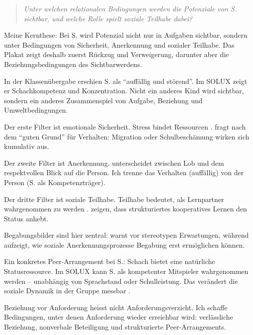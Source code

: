 \documentclass[ngerman, a4paper]{article}
\begin{document}
\begin{quote}\itshape
Unter welchen relationalen Bedingungen werden die Potenziale von S. sichtbar,
und welche Rolle spielt soziale Teilhabe dabei?
\end{quote}

Meine Kernthese: Bei S. wird Potenzial nicht nur in Aufgaben sichtbar, sondern
unter Bedingungen von Sicherheit, Anerkennung und sozialer Teilhabe. Das Plakat
zeigt deshalb zuerst Rückzug und Verweigerung, darunter aber die
Beziehungsbedingungen des Sichtbarwerdens.

In der Klassenübergabe erschien S. als \enquote{auffällig und störend}. Im
SOLUX zeigt er Schachkompetenz und Konzentration. Nicht ein anderes Kind wird
sichtbar, sondern ein anderes Zusammenspiel von Aufgabe, Beziehung und
Umweltbedingungen.

Der erste Filter ist emotionale Sicherheit. Stress bindet Ressourcen
\parencites{evers2025stress}{kuhl2019diversitaet}. \textcite{behrensen2019inklusive}
fragt nach dem \enquote{guten Grund} für Verhalten: Migration oder
Schulbeschämung wirken sich kumulativ aus.

Der zweite Filter ist Anerkennung. \textcite{grossrieder2010anerkennung}
unterscheidet zwischen Lob und dem respektvollen Blick auf die Person. Ich
trenne das Verhalten (auffällig) von der Person (S. als Kompetenzträger).

Der dritte Filter ist soziale Teilhabe. Teilhabe bedeutet, als
Lernpartner wahrgenommen zu werden \parencites{kesselshannover2015gleichaltrige}{baumert2022freundschaftwerte}.
\textcite{tschoppbuholzergruetter2022intergruppenkontakt} zeigen, dass
strukturiertes kooperatives Lernen den Status anhebt.

Begabungsbilder sind hier zentral: \textcite{baudson2021wasdenken} warnt vor
stereotypen Erwartungen, während \textcite{wagener2021bfhemmendfoerdernd}
aufzeigt, wie soziale Anerkennungsprozesse Begabung erst ermöglichen können.

Ein konkretes Peer-Arrangement bei S.: Schach bietet eine natürliche
Statusressource. Im SOLUX kann S. als kompetenter Mitspieler wahrgenommen werden
-- unabhängig von Sprachstand oder Schulleistung. Das verändert die soziale
Dynamik in der Gruppe messbar
\parencite{tschoppbuholzergruetter2022intergruppenkontakt}.

Beziehung vor Anforderung heisst nicht Anforderungsverzicht. Ich schaffe
Bedingungen, unter denen Anforderung wieder erreichbar wird: verlässliche
Beziehung, nonverbale Beteiligung und strukturierte Peer-Arrangements.
\end{document}
